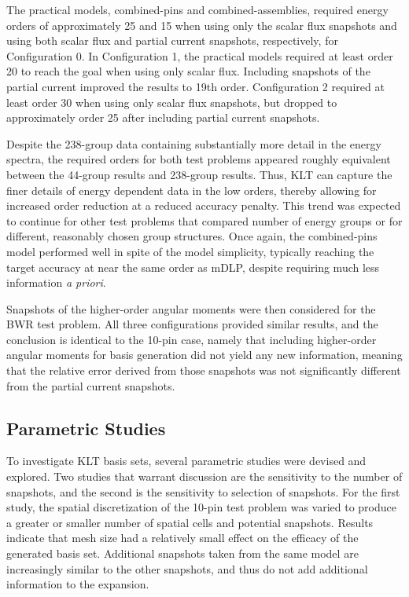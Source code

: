 \documentclass[5p,times,twocolumn,10pt]{elsarticle}
\begin{document}
    The practical models, combined-pins and combined-assemblies, required energy
    orders of approximately 25 and 15 when using only the scalar flux snapshots
    and using both scalar flux and partial current snapshots, respectively, for
    Configuration 0. In Configuration 1, the practical models required at
    least order 20 to reach the goal when using only scalar flux. Including
    snapshots of the partial current improved the results to 19th order.
    Configuration 2 required at least order
    30 when using only scalar flux snapshots, but dropped to approximately
    order 25 after
    including partial current snapshots.

    Despite the 238-group data containing substantially
    more detail in the energy spectra, the required orders for both test
    problems appeared roughly equivalent between the 44-group
    results and 238-group results. Thus, KLT can capture the finer details of
    energy dependent data in the low orders, thereby allowing for increased
    order reduction at a reduced accuracy penalty. This trend was expected to
    continue for other test problems that compared number of energy groups
    or for different, reasonably chosen group structures. Once
    again, the combined-pins model performed well in spite of the model
    simplicity, typically reaching the target accuracy at near the same order
as
    mDLP, despite requiring much less information {\it a priori}.

    Snapshots of the higher-order angular moments were then considered for the
    BWR test problem. All three configurations provided similar results, and
    the conclusion is identical to the 10-pin case, namely that including
    higher-order angular moments for basis generation did not
    yield any new information, meaning that the relative error derived from
    those snapshots was not significantly different from the partial current
snapshots.

    \subsection{Parametric Studies}

    To investigate KLT basis sets, several parametric studies were devised and
    explored. Two studies that warrant discussion are the sensitivity to
    the number
    of snapshots, and the second is the sensitivity
    to selection of snapshots. For the first study, the spatial
    discretization of the 10-pin test problem
    was varied to produce a greater or smaller number of
    spatial cells and potential snapshots. Results indicate that mesh size had
    a relatively
    small effect on the efficacy of the generated basis set. Additional
    snapshots taken from the same model are increasingly similar to the other
    snapshots, and thus do not add additional information to the expansion.
\end{document}
